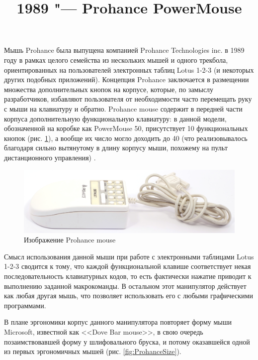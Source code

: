 \documentclass[11pt, a4paper]{article}
\begin{document}
\title{1989 "--- Prohance PowerMouse}
\date{}
\maketitle

Мышь Prohance была выпущена компанией Prohance Technologies inc. в 1989 году в рамках целого семейства из нескольких мышей и одного трекбола, ориентированных на пользователей электронных таблиц Lotus 1-2-3 (и некоторых других подобных приложений). Концепция Prohance заключается в размещении множества дополнительных кнопок на корпусе, которые, по замыслу разработчиков, избавляют пользователя от необходимости часто перемещать руку с мыши на клавиатуру и обратно. Prohance mouse содержит в передней части корпуса дополнительную функциональную клавиатуру: в данной модели, обозначенной на коробке как PowerMouse 50, присутствует 10 функциональных кнопок (рис. \ref{fig:ProhancePhoto}), а вообще их число могло доходить до 40 (что реализовывалось благодаря сильно вытянутому в длину корпусу мыши, похожему на пульт дистанционного управления) \cite{livingston}.

\begin{figure}[h]
    \centering
    \includegraphics[scale=0.55]{1989_prohance_powermouse/pic_30.jpg}
    \caption{Изображение Prohance mouse}
    \label{fig:ProhancePhoto}
\end{figure}

Смысл использования данной мыши при работе с электронными таблицами Lotus 1-2-3 сводится к тому, что каждой функциональной клавише соответствует некая последовательность клавиатурных кодов, то есть фактически нажатие приводит к выполнению заданной макрокоманды. В остальном этот манипулятор действует как любая другая мышь, что позволяет использовать его с любыми графическими программами.

В плане эргономики корпус данного манипулятора повторяет форму мыши Microsoft, известной как <<Dove Bar mouse>>, в свою очередь позаимствовавшей форму у шлифовального бруска, и потому оказавшейся одной из первых эргономичных мышей (рис. \ref{fig:ProhanceSize}).
\end{document}
